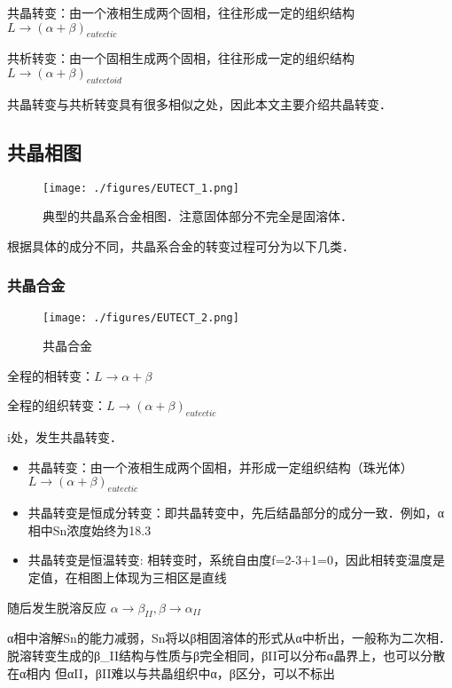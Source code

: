 共晶转变：由一个液相生成两个固相，往往形成一定的组织结构 $L \rightarrow (\alpha+\beta)_{eutectic}$

共析转变：由一个固相生成两个固相，往往形成一定的组织结构 $L \rightarrow (\alpha+\beta)_{eutectoid}$

共晶转变与共析转变具有很多相似之处，因此本文主要介绍共晶转变．

\subsection{共晶相图}
\begin{figure}[ht]
\centering
\texttt{[image: ./figures/EUTECT\_1.png]}
\caption{典型的共晶系合金相图．注意固体部分不完全是固溶体．} \label{EUTECT_fig1}
\end{figure}
根据具体的成分不同，共晶系合金的转变过程可分为以下几类．

\subsubsection{共晶合金}
\begin{figure}[ht]
\centering
\texttt{[image: ./figures/EUTECT\_2.png]}
\caption{共晶合金} \label{EUTECT_fig2}
\end{figure}

全程的相转变：$L \rightarrow \alpha+\beta$

全程的组织转变：$L \rightarrow (\alpha+\beta)_{eutectic}$

i处，发生共晶转变．
\begin{itemize}
\item 共晶转变：由一个液相生成两个固相，并形成一定组织结构（珠光体） $L \rightarrow (\alpha+\beta)_{eutectic}$
\item 共晶转变是恒成分转变：即共晶转变中，先后结晶部分的成分一致．例如，α相中Sn浓度始终为18.3%
\item 共晶转变是恒温转变: 相转变时，系统自由度f=2-3+1=0，因此相转变温度是定值，在相图上体现为三相区是直线
\end{itemize}

随后发生脱溶反应 $\alpha \rightarrow \beta_{II}, \beta \rightarrow \alpha_{II}$

	α相中溶解Sn的能力减弱，Sn将以β相固溶体的形式从α中析出，一般称为二次相．
	脱溶转变生成的β_II结构与性质与β完全相同，βII可以分布α晶界上，也可以分散在α相内
	但αII，βII难以与共晶组织中α，β区分，可以不标出